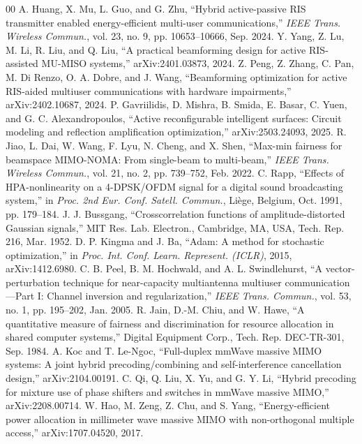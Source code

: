 \documentclass{ieeeaccess}
\begin{document}
\begin{thebibliography}{00}
 A. Huang, X. Mu, L. Guo, and G. Zhu, ``Hybrid active-passive RIS transmitter enabled energy-efficient multi-user communications,'' \emph{IEEE Trans. Wireless Commun.}, vol. 23, no. 9, pp. 10653--10666, Sep. 2024.
 Y. Yang, Z. Lu, M. Li, R. Liu, and Q. Liu, ``A practical beamforming design for active RIS-assisted MU-MISO systems,'' arXiv:2401.03873, 2024.
 Z. Peng, Z. Zhang, C. Pan, M. Di Renzo, O. A. Dobre, and J. Wang, ``Beamforming optimization for active RIS-aided multiuser communications with hardware impairments,'' arXiv:2402.10687, 2024.
 P. Gavriilidis, D. Mishra, B. Smida, E. Basar, C. Yuen, and G. C. Alexandropoulos, ``Active reconfigurable intelligent surfaces: Circuit modeling and reflection amplification optimization,'' arXiv:2503.24093, 2025.
 R. Jiao, L. Dai, W. Wang, F. Lyu, N. Cheng, and X. Shen, ``Max-min fairness for beamspace MIMO-NOMA: From single-beam to multi-beam,'' \emph{IEEE Trans. Wireless Commun.}, vol. 21, no. 2, pp. 739--752, Feb. 2022.
 C. Rapp, ``Effects of HPA-nonlinearity on a 4-DPSK/OFDM signal for a digital sound broadcasting system,'' in \emph{Proc. 2nd Eur. Conf. Satell. Commun.}, Li\`ege, Belgium, Oct. 1991, pp. 179--184.
 J. J. Bussgang, ``Crosscorrelation functions of amplitude-distorted Gaussian signals,'' MIT Res. Lab. Electron., Cambridge, MA, USA, Tech. Rep. 216, Mar. 1952.
 D. P. Kingma and J. Ba, ``Adam: A method for stochastic optimization,'' in \emph{Proc. Int. Conf. Learn. Represent. (ICLR)}, 2015, arXiv:1412.6980.
 C. B. Peel, B. M. Hochwald, and A. L. Swindlehurst, ``A vector-perturbation technique for near-capacity multiantenna multiuser communication---Part I: Channel inversion and regularization,'' \emph{IEEE Trans. Commun.}, vol. 53, no. 1, pp. 195--202, Jan. 2005.
 R. Jain, D.-M. Chiu, and W. Hawe, ``A quantitative measure of fairness and discrimination for resource allocation in shared computer systems,'' Digital Equipment Corp., Tech. Rep. DEC-TR-301, Sep. 1984.
 A. Koc and T. Le-Ngoc, ``Full-duplex mmWave massive MIMO systems: A joint hybrid precoding/combining and self-interference cancellation design,'' arXiv:2104.00191.
 C. Qi, Q. Liu, X. Yu, and G. Y. Li, ``Hybrid precoding for mixture use of phase shifters and switches in mmWave massive MIMO,'' arXiv:2208.00714.
 W. Hao, M. Zeng, Z. Chu, and S. Yang, ``Energy-efficient power allocation in millimeter wave massive MIMO with non-orthogonal multiple access,'' arXiv:1707.04520, 2017.
\end{thebibliography}
\end{document}
